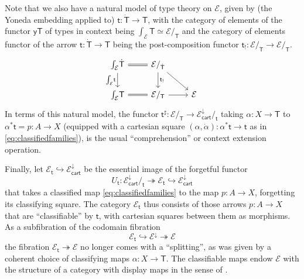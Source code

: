 \documentclass[12pt,reqno]{amsart}
\newcommand{\EE}{\ensuremath{\mathcal{E}}}
\newcommand{\y}{\ensuremath{\mathsf{y}}} %
\newcommand{\hook}{\ensuremath{\hookrightarrow}}
\renewcommand{\epi}{\ensuremath{\twoheadrightarrow}}
\renewcommand{\to}{\ensuremath{\rightarrow}}
\renewcommand{\t}{\ensuremath{\mathsf{t}}}
\newcommand{\T}{\ensuremath{\mathsf{T}}}
\newcommand{\TT}{\ensuremath{\dot{\mathsf{T}}}}
\theoremstyle{remark}
\theoremstyle{definition}
\begin{document}
Note that we also have a natural model of type theory on $\EE$, given by (the Yoneda embedding applied to) $\t: \TT \to \T$, with the category of elements of the functor $\y\T$ of types in context being $\int_{\EE}\!\T \simeq \EE/_\T$ and the category of elements functor of the arrow $\t: \TT \to \T$ being the post-composition functor $\t_{!} : \EE/_{\TT} \to \EE/_{\T}$.
 \begin{equation}\label{eq:sliceadjunctionelements}
\begin{tikzcd}
\int_{\EE}\!\TT \ar[d,swap, "{\int_{\EE}\!\t}"] \ar[r, equals] & \EE/_{\TT} \ar[d, "{\t_{!}}"] \ar[rd] & \\
 \int_{\EE}\!\T \ar[r,equals] &  \EE/_\T \ar[r] & \EE
 \end{tikzcd}
 \end{equation}
 In terms of this natural model, the functor $\t^{\sharp} : \EE/_\T \to \EE^{\downarrow}_{\mathsf{cart}}/_{\t}$ taking $\alpha : X \to \T$ to $\alpha^*\t = p: A \to X$ (equipped with a cartesian square $(\alpha, \dot{\alpha}) : \alpha^*\t \to \t$ as in \eqref{eq:classifiedfamilies}), is the usual ``comprehension'' or context extension operation.
 
Finally, let $\EE_\t \hook  \EE^{\downarrow}_{\mathsf{cart}}$ be the essential image of the forgetful functor 
\[
U_\t :  \EE^{\downarrow}_{\mathsf{cart}}/_{\t} \twoheadrightarrow \EE_\t \hook \EE^{\downarrow}_{\mathsf{cart}}
\]
that takes a classified map \eqref{eq:classifiedfamilies} to the map $p : A \to X$, forgetting its classifying square.  
The category $\EE_\t$ thus consists of those arrows $p:A \to X$ that are ``classifiable'' by $\t$, with cartesian squares between them as morphisms. As a subfibration of the codomain fibration $$\EE_\t \hook \EE^\downarrow \epi \EE$$ the fibration $\EE_\t \epi \EE$
no longer comes with a ``splitting'', as was given by a coherent choice of classifying maps $\alpha : X \to \T$.  The classifiable maps endow $\EE$ with the structure of a category with display maps in the sense of \cite{Taylor:PFM}.  
\end{document}
